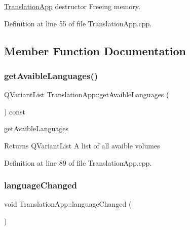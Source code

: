 \hyperlink{class_translation_app}{Translation\+App} destructor Freeing memory. 



Definition at line 55 of file Translation\+App.\+cpp.



\subsection{Member Function Documentation}
\mbox{\label{class_translation_app_a4016e918026a89c3b3182d965e2ca12b}} 
\subsubsection{\texorpdfstring{get\+Avaible\+Languages()}{getAvaibleLanguages()}}
{\footnotesize\ttfamily Q\+Variant\+List Translation\+App\+::get\+Avaible\+Languages (\begin{DoxyParamCaption}{ }\end{DoxyParamCaption}) const}



get\+Avaible\+Languages 

\begin{DoxyReturn}{Returns}
Q\+Variant\+List A list of all avaible volumes 
\end{DoxyReturn}


Definition at line 89 of file Translation\+App.\+cpp.

\mbox{\label{class_translation_app_ad4e2b88fd1f024546a80f68c3806b77b}} 
\subsubsection{\texorpdfstring{language\+Changed}{languageChanged}}
{\footnotesize\ttfamily void Translation\+App\+::language\+Changed (\begin{DoxyParamCaption}{ }\end{DoxyParamCaption})\hspace{0.3cm}{\ttfamily [signal]}}



